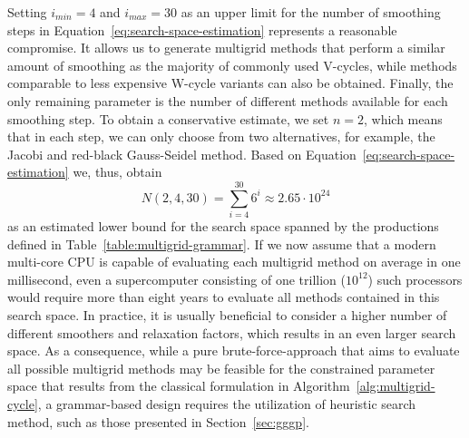 Setting $i_{min} = 4$ and $i_{max} = 30$ as an upper limit for the number of smoothing steps in Equation~\eqref{eq:search-space-estimation} represents a reasonable compromise. 
It allows us to generate multigrid methods that perform a similar amount of smoothing as the majority of commonly used V-cycles, while methods comparable to less expensive W-cycle variants can also be obtained.
Finally, the only remaining parameter is the number of different methods available for each smoothing step.
To obtain a conservative estimate, we set $n = 2$, which means that in each step, we can only choose from two alternatives, for example, the Jacobi and red-black Gauss-Seidel method.
Based on Equation~\eqref{eq:search-space-estimation} we, thus, obtain 
\begin{equation}\tag{4.12}
	N(2, 4, 30) = \sum_{i = 4}^{30} 6^i \approx 2.65 \cdot 10^{24}
\end{equation}
as an estimated lower bound for the search space spanned by the productions defined in Table~\ref{table:multigrid-grammar}.
If we now assume that a modern multi-core CPU is capable of evaluating each multigrid method on average in one millisecond,
even a supercomputer consisting of one trillion ($10^{12}$) such processors would require more than eight years to evaluate all methods contained in this search space.
In practice, it is usually beneficial to consider a higher number of different smoothers and relaxation factors, which results in an even larger search space.
As a consequence, while a pure brute-force-approach that aims to evaluate all possible multigrid methods may be feasible for the constrained parameter space that results from the classical formulation in Algorithm~\ref{alg:multigrid-cycle}, a grammar-based design requires the utilization of heuristic search method, such as those presented in Section~\ref{sec:gggp}.
